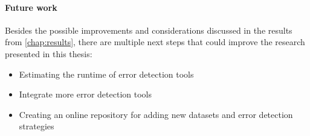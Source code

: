 \paragraph{Future work}
Besides the possible improvements and considerations discussed in the results from \autoref{chap:results}, there are multiple next steps that could improve the research presented in this thesis:
\begin{itemize}
    \item Estimating the runtime of error detection tools
    \item Integrate more error detection tools
    \item Creating an online repository for adding new datasets and error detection strategies
\end{itemize}
